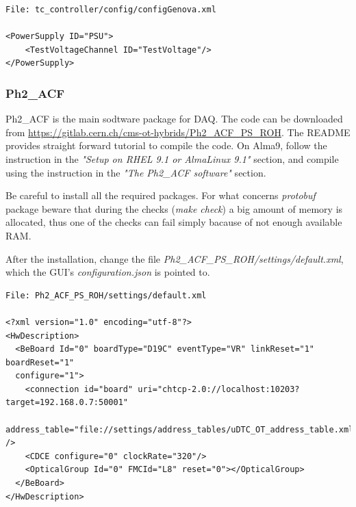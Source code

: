 \documentclass[10pt,a4paper]{article}
\begin{document}
\begin{framed}
\begin{verbatim}
File: tc_controller/config/configGenova.xml

<PowerSupply ID="PSU">
    <TestVoltageChannel ID="TestVoltage"/>
</PowerSupply>
\end{verbatim}
\end{framed}

\subsubsection{Ph2\_ACF}
\label{ph2_acf}

Ph2\_ACF is the main sodtware package for DAQ.
The code can be downloaded from \url{https://gitlab.cern.ch/cms-ot-hybrids/Ph2_ACF_PS_ROH}. 
The README provides straight forward tutorial to compile the code. On Alma9, follow the instruction in the \emph{"Setup on RHEL 9.1 or AlmaLinux 9.1"} section, and compile using the instruction in the \emph{"The Ph2\_ACF software"} section.

Be careful to install all the required packages. For what concerns {\it protobuf} package beware that during the checks (\emph{make check}) a big amount of memory is allocated, thus one of the checks can fail simply bacause of not enough available RAM.  


After the installation, change the file \emph{Ph2\_ACF\_PS\_ROH/settings/default.xml}, which the GUI's \emph{configuration.json} is pointed to.

\begin{framed}
\begin{verbatim}
File: Ph2_ACF_PS_ROH/settings/default.xml

<?xml version="1.0" encoding="utf-8"?>
<HwDescription>
  <BeBoard Id="0" boardType="D19C" eventType="VR" linkReset="1" boardReset="1" 
  configure="1">
    <connection id="board" uri="chtcp-2.0://localhost:10203?target=192.168.0.7:50001"    
    address_table="file://settings/address_tables/uDTC_OT_address_table.xml" />
    <CDCE configure="0" clockRate="320"/>
    <OpticalGroup Id="0" FMCId="L8" reset="0"></OpticalGroup>
  </BeBoard>
</HwDescription>

\end{verbatim}
\end{framed}
\end{document}
